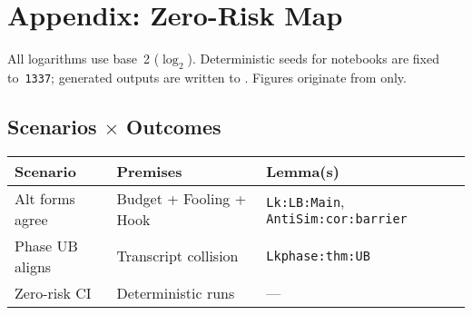 \section{Appendix: Zero-Risk Map}\label{sec:zero-risk-map}
All logarithms use base~2 ($\log_2$).
Deterministic seeds for notebooks are fixed to~\texttt{1337};
generated outputs are written to .
Figures originate from  only.

\subsection*{Scenarios \(\times\) Outcomes}

\begin{center}
\begin{tabular}{l l l}
\toprule
\textbf{Scenario} & \textbf{Premises} & \textbf{Lemma(s)}\\
\midrule
Alt forms agree & Budget + Fooling + Hook & \texttt{Lk:LB:Main}, \texttt{AntiSim:cor:barrier} \\
Phase UB aligns & Transcript collision & \texttt{Lkphase:thm:UB} \\
Zero-risk CI & Deterministic runs & — \\
\bottomrule
\end{tabular}
\end{center}